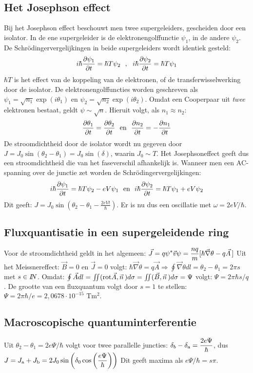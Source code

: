 \subsection{Het Josephson effect}
Bij het Josephson effect beschouwt men twee supergeleiders, gescheiden door
een isolator. In de ene supergeleider is de elektronengolffunctie $\psi_1$,
in de andere $\psi_2$. De Schr\"odinger\-vergelijkingen in beide
supergeleiders wordt identiek gesteld:
\[
i\hbar\frac{\partial \psi_1}{\partial t}=\hbar T\psi_2~~,~~i\hbar\frac{\partial \psi_2}{\partial t}=\hbar T\psi_1
\]
$\hbar T$ is het effect van de koppeling van de elektronen, of de
transferwisselwerking door de isolator. De elektronengolffuncties worden
geschreven als $\psi_1=\sqrt{n_1}\exp(i\theta_1)$ en
$\psi_2=\sqrt{n_2}\exp(i\theta_2)$.
Omdat een Cooperpaar uit {\em twee} elektronen bestaat, geldt
$\psi\sim\sqrt{n}$. Hieruit volgt, als $n_1\approx n_2$:
\[
\frac{\partial \theta_1}{\partial t}=\frac{\partial \theta_2}{\partial t}~~\mbox{en}~~\frac{\partial n_2}{\partial t}=-\frac{\partial n_1}{\partial t}
\]
De stroomdichtheid door de isolator wordt nu gegeven door
$J=J_0\sin(\theta_2-\theta_1)=J_0\sin(\delta)$, waarin $J_0\sim T$.
Het Josephsoneffect geeft dus een stroomdichtheid die van het faseverschil
afhankelijk is. Wanneer men een AC-spanning over de junctie zet worden de
Schr\"odingervergelijkingen:
\[
i\hbar\frac{\partial \psi_1}{\partial t}=\hbar T\psi_2-eV\psi_1~~\mbox{en}~~
i\hbar\frac{\partial \psi_2}{\partial t}=\hbar T\psi_1+eV\psi_2
\]
Dit geeft:
$\displaystyle J=J_0\sin\left(\theta_2-\theta_1-\frac{2eVt}{\hbar}\right)$.
\npar
Er is nu dus een oscillatie met $\omega=2eV/\hbar$.

\subsection{Fluxquantisatie in een supergeleidende ring}
Voor de stroomdichtheid geldt in het algemeen:
$\displaystyle\vec{J}=q\psi^*\vec{v}\psi=\frac{nq}{m}[\hbar\vec{\nabla}\theta-q\vec{A}\,]$
\npar
Uit het Meissnereffect: $\vec{B}=0$ en $\vec{J}=0$ volgt:
$\hbar\vec{\nabla}\theta=q\vec{A}
\Rightarrow\oint\vec{\nabla}\theta dl=\theta_2-\theta_1=2\pi s$ met $s\in I\hspace{-1mm}N$.
Omdat: $\oint\vec{A}dl=\int\hspace*{-1.5mm}\int(\mbox{rot}\vec{A},\vec{n}\,)d\sigma=
\int\hspace*{-1.5mm}\int(\vec{B},\vec{n}\,)d\sigma=\Psi$ volgt:
$\Psi=2\pi\hbar s/q$. De grootte van een fluxquantum volgt door $s=1$ te
stellen: $\Psi=2\pi\hbar/e=2,0678\cdot10^{-15}$ Tm$^2$.

\subsection{Macroscopische quantuminterferentie}
Uit $\theta_2-\theta_1=2e\Psi/\hbar$ volgt voor twee parallelle juncties:
$\displaystyle\delta_b-\delta_{\rm a}=\frac{2e\Psi}{\hbar}$, dus
\npar
$\displaystyle
J=J_{\rm a}+J_{\rm b}=2J_0\sin\left(\delta_0\cos\left(\frac{e\Psi}{\hbar}\right)\right)
$
Dit geeft maxima als $e\Psi/\hbar=s\pi$.

